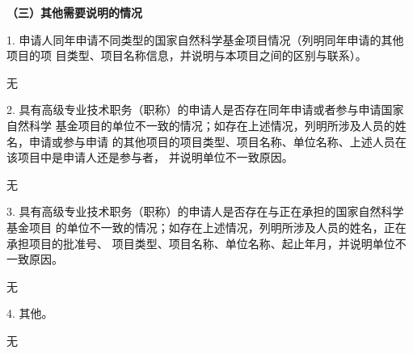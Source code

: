 {\kaishu{}\sihao{}
  \textcolor{NsfcBlue}
  {\bfseries{}（三）其他需要说明的情况}
}


{\kaishu{}\sihao{} \color{NsfcBlue}
1. 申请人同年申请不同类型的国家自然科学基金项目情况（列明同年申请的其他项目的项
目类型、项目名称信息，并说明与本项目之间的区别与联系）。
}


无

{\kaishu{}\sihao{} \color{NsfcBlue}
2. 具有高级专业技术职务（职称）的申请人是否存在同年申请或者参与申请国家自然科学
基金项目的单位不一致的情况；如存在上述情况，列明所涉及人员的姓名，申请或参与申请
的其他项目的项目类型、项目名称、单位名称、上述人员在该项目中是申请人还是参与者，
并说明单位不一致原因。
}


无

{\kaishu{}\sihao{} \color{NsfcBlue}
3. 具有高级专业技术职务（职称）的申请人是否存在与正在承担的国家自然科学基金项目
的单位不一致的情况；如存在上述情况，列明所涉及人员的姓名，正在承担项目的批准号、
项目类型、项目名称、单位名称、起止年月，并说明单位不一致原因。
}


无

{\kaishu{}\sihao{} \color{NsfcBlue}
4. 其他。
}


无
